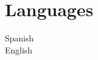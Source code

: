 \documentclass[]{plushcv}
\begin{document}
\begin{minipage}[t]{0.25\textwidth}

\section{Languages}
Spanish \\
English \\
\sectionsep







\end{minipage}
\end{document}
